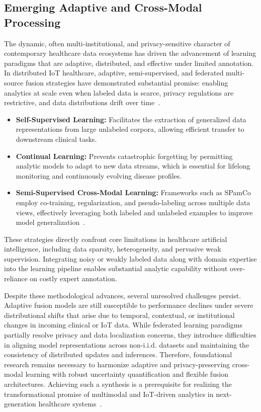 \subsection{Emerging Adaptive and Cross-Modal Processing}

The dynamic, often multi-institutional, and privacy-sensitive character of contemporary healthcare data ecosystems has driven the advancement of learning paradigms that are adaptive, distributed, and effective under limited annotation. In distributed IoT healthcare, adaptive, semi-supervised, and federated multi-source fusion strategies have demonstrated substantial promise: enabling analytics at scale even when labeled data is scarce, privacy regulations are restrictive, and data distributions drift over time~\cite{ref105,ref106,ref107}. 

\begin{itemize}
    \item \textbf{Self-Supervised Learning:} Facilitates the extraction of generalized data representations from large unlabeled corpora, allowing efficient transfer to downstream clinical tasks.
    \item \textbf{Continual Learning:} Prevents catastrophic forgetting by permitting analytic models to adapt to new data streams, which is essential for lifelong monitoring and continuously evolving disease profiles.
    \item \textbf{Semi-Supervised Cross-Modal Learning:} Frameworks such as SPamCo employ co-training, regularization, and pseudo-labeling across multiple data views, effectively leveraging both labeled and unlabeled examples to improve model generalization~\cite{ref104,ref105}.
\end{itemize}

These strategies directly confront core limitations in healthcare artificial intelligence, including data sparsity, heterogeneity, and pervasive weak supervision. Integrating noisy or weakly labeled data along with domain expertise into the learning pipeline enables substantial analytic capability without over-reliance on costly expert annotation.

Despite these methodological advances, several unresolved challenges persist. Adaptive fusion models are still susceptible to performance declines under severe distributional shifts that arise due to temporal, contextual, or institutional changes in incoming clinical or IoT data. While federated learning paradigms partially resolve privacy and data localization concerns, they introduce difficulties in aligning model representations across non-i.i.d. datasets and maintaining the consistency of distributed updates and inferences. Therefore, foundational research remains necessary to harmonize adaptive and privacy-preserving cross-modal learning with robust uncertainty quantification and flexible fusion architectures. Achieving such a synthesis is a prerequisite for realizing the transformational promise of multimodal and IoT-driven analytics in next-generation healthcare systems~\cite{ref104,ref105,ref106,ref107}.

